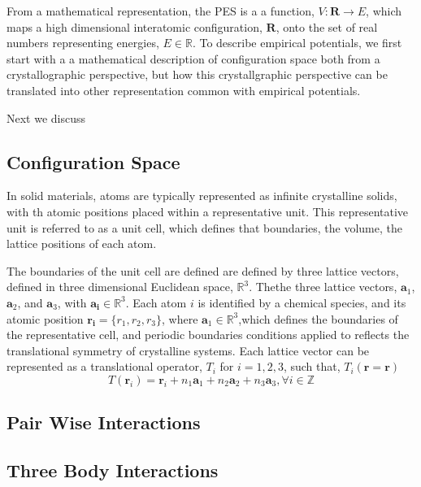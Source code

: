 From a mathematical representation, the PES is a a function, ${V:\bm{R}\rightarrow E}$, which maps a high dimensional interatomic configuration, $\bm{R}$, onto the set of real numbers representing energies, $E\in\mathbb{R}$.
To describe empirical potentials, we first start with a a mathematical description of configuration space both from a crystallographic perspective, but how this crystallgraphic perspective can be translated into other representation common with empirical potentials.

Next we discuss

\subsection{Configuration Space}
In solid materials, atoms are typically represented as infinite crystalline solids, with th atomic positions placed within a representative unit.
This representative unit is referred to as a unit cell, which defines that boundaries, the volume, the lattice positions of each atom.

The boundaries of the unit cell are defined are defined by three lattice vectors, defined in three dimensional Euclidean space, $\mathbb{R}^3$.
Thethe three lattice vectors, $\bm{a}_1$, $\bm{a}_2$, and $\bm{a}_3$, with $\bm{a_i}\in\mathbb{R}^3$.
Each atom $i$ is identified by a chemical species, and its atomic position ${\bm{r_i}=\{r_1,r_2,r_3\}}$, where $\bm{a}_1 \in \mathbb{R}^3$,which defines the boundaries of the representative cell, and periodic boundaries conditions applied to reflects the translational symmetry of crystalline systems.
Each lattice vector can be represented as a translational operator, $T_i$ for $i={1,2,3}$, such that, $T_i(\bm{r}=\bm{r})$
\begin{equation}
    T(\bm{r}_i) = \bm{r}_i
		    + n_1 \bm{a}_1
				+ n_2 \bm{a}_2
				+ n_3 \bm{a}_3, \forall i \in \mathbb{Z}
\end{equation}

\subsection{Pair Wise Interactions}

\subsection{Three Body Interactions}

